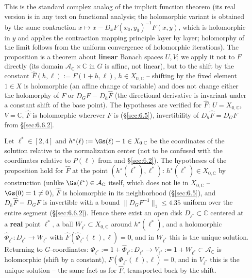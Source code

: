 This is the standard complex analog of the implicit function theorem (its real version is in any text on functional analysis; the holomorphic variant is obtained by the same contraction $x\mapsto x-D_xF(x_0,y_0)^{-1}F(x,y)$, which is holomorphic in $y$ and applies the contraction mapping principle layer by layer; holomorphy of the limit follows from the uniform convergence of holomorphic iterations). The proposition is a theorem about \textbf{linear} Banach spaces $U,V$; we apply it not to $F$ directly (its domain $\mathcal A_{\mathbb C}\times\mathbb C$ in $G$ is affine, not linear), but to the shift by the constant $\widehat F(h,\ell):=F(1+h,\ell)$, $h\in X_{0,\mathbb C}$ -- shifting by the fixed element $1\in X$ is holomorphic (an affine change of variable) and does not change either the holomorphy of $F$ or $D_GF=D_h\widehat F$ (the directional derivative is invariant under a constant shift of the base point). The hypotheses are verified for $\widehat F$: $U=X_{0,\mathbb C}$, $V=\mathbb C$, $\widehat F$ is holomorphic wherever $F$ is (\S\ref{sec:6.5}), invertibility of $D_h\widehat F=D_GF$ from \S\ref{sec:6.6.2}.

\begin{corollary}
Let $\ell^{\ast}\in[2,4]$ and $h^{\star}(\ell):=\Gs(\ell)-1\in X_{0,\mathbb C}$ be the coordinates of the solution relative to the normalization center (not to be confused with the coordinates relative to $P(\ell)$ from  and \S\ref{sec:6.2}). The hypotheses of the proposition hold for $\widehat F$ at the point $(h^{\star}(\ell^{\ast}),\ell^{\ast})$: $h^{\star}(\ell^{\ast})\in X_{0,\mathbb C}$ by construction (unlike $\Gs(\ell^{\ast})\in\mathcal A_{\mathbb C}$ itself, which does not lie in $X_{0,\mathbb C}$ -- $\Gs(0)=1\ne0$), $\widehat F$ is holomorphic in its neighborhood (\S\ref{sec:6.5}), and $D_h\widehat F=D_GF$ is invertible with a bound $\|D_GF^{-1}\|_1\le4.35$ uniform over the entire segment (\S\ref{sec:6.6.2}). Hence there exist an open disk $D_{\ell^{\ast}}\subset\mathbb C$ centered at a \textbf{real} point $\ell^{\ast}$, a ball $W_{\ell^{\ast}}\subset X_{0,\mathbb C}$ around $h^{\star}(\ell^{\ast})$, and a holomorphic $\widehat\Phi_{\ell^{\ast}}:D_{\ell^{\ast}}\to W_{\ell^{\ast}}$ with $\widehat F(\widehat\Phi_{\ell^{\ast}}(\ell),\ell)=0$, and in $W_{\ell^{\ast}}$ this is the unique solution. Returning to $G$-coordinates: $\Phi_{\ell^{\ast}}:=1+\widehat\Phi_{\ell^{\ast}}:D_{\ell^{\ast}}\to V_{\ell^{\ast}}:=1+W_{\ell^{\ast}}\subset\mathcal A_{\mathbb C}$ is holomorphic (shift by a constant), $F(\Phi_{\ell^{\ast}}(\ell),\ell)=0$, and in $V_{\ell^{\ast}}$ this is the unique solution -- the same fact as for $\widehat F$, transported back by the shift.
\end{corollary}

